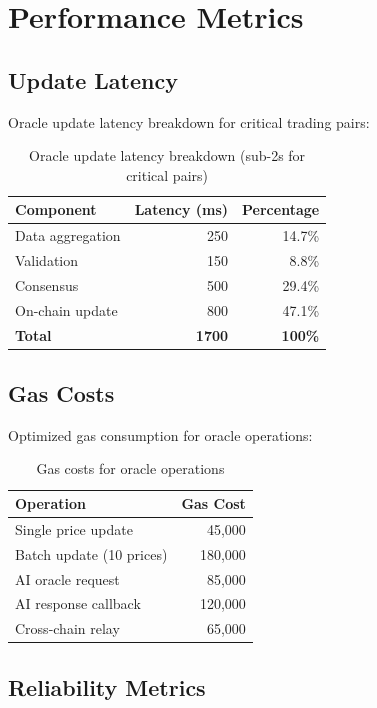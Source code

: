 \section{Performance Metrics}


\subsection{Update Latency}

Oracle update latency breakdown for critical trading pairs:

\begin{table}[h]
\centering
\begin{tabular}{lrr}
\toprule
\textbf{Component} & \textbf{Latency (ms)} & \textbf{Percentage} \\
\midrule
Data aggregation & 250 & 14.7\% \\
Validation & 150 & 8.8\% \\
Consensus & 500 & 29.4\% \\
On-chain update & 800 & 47.1\% \\
\midrule
\textbf{Total} & \textbf{1700} & \textbf{100\%} \\
\bottomrule
\end{tabular}
\caption{Oracle update latency breakdown (sub-2s for critical pairs)}
\end{table}

\subsection{Gas Costs}

Optimized gas consumption for oracle operations:

\begin{table}[h]
\centering
\begin{tabular}{lr}
\toprule
\textbf{Operation} & \textbf{Gas Cost} \\
\midrule
Single price update & 45,000 \\
Batch update (10 prices) & 180,000 \\
AI oracle request & 85,000 \\
AI response callback & 120,000 \\
Cross-chain relay & 65,000 \\
\bottomrule
\end{tabular}
\caption{Gas costs for oracle operations}
\end{table}

\subsection{Reliability Metrics}

